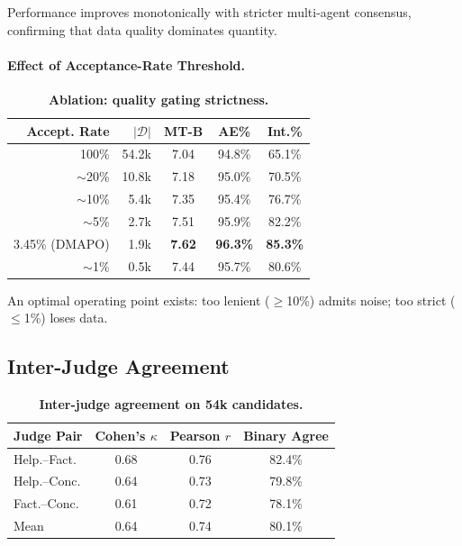 \documentclass{article}
\newcommand{\ours}{\textsc{DMAPO}}
\newcommand{\best}[1]{\textbf{#1}}
\begin{document}
Performance improves monotonically with stricter multi-agent consensus, confirming that data quality dominates quantity.

\paragraph{Effect of Acceptance-Rate Threshold.}

\begin{table}[t]
\centering
\caption{\textbf{Ablation: quality gating strictness.}}
\label{tab:abl_threshold}
\vspace{0.3em}
\small
\begin{tabular}{r r ccc}
\toprule
\textbf{Accept. Rate} & $|\mathcal{D}|$ & \textbf{MT-B} & \textbf{AE\%} & \textbf{Int.\%} \\
\midrule
100\%  & 54.2k & 7.04 & 94.8\% & 65.1\% \\
$\sim$20\% & 10.8k & 7.18 & 95.0\% & 70.5\% \\
$\sim$10\% & 5.4k  & 7.35 & 95.4\% & 76.7\% \\
$\sim$5\%  & 2.7k  & 7.51 & 95.9\% & 82.2\% \\
3.45\% (\ours) & 1.9k & \best{7.62} & \best{96.3\%} & \best{85.3\%} \\
$\sim$1\%  & 0.5k  & 7.44 & 95.7\% & 80.6\% \\
\bottomrule
\end{tabular}
\end{table}

An optimal operating point exists: too lenient ($\geq$10\%) admits noise; too strict ($\leq$1\%) loses data.

\subsection{Inter-Judge Agreement}

\begin{table}[t]
\centering
\caption{\textbf{Inter-judge agreement on 54k candidates.}}
\label{tab:agreement}
\vspace{0.3em}
\small
\begin{tabular}{l ccc}
\toprule
\textbf{Judge Pair} & \textbf{Cohen's $\kappa$} & \textbf{Pearson $r$} & \textbf{Binary Agree} \\
\midrule
Help.--Fact.   & 0.68 & 0.76 & 82.4\% \\
Help.--Conc.   & 0.64 & 0.73 & 79.8\% \\
Fact.--Conc.   & 0.61 & 0.72 & 78.1\% \\
\midrule
Mean           & 0.64 & 0.74 & 80.1\% \\
\bottomrule
\end{tabular}
\end{table}
\end{document}
